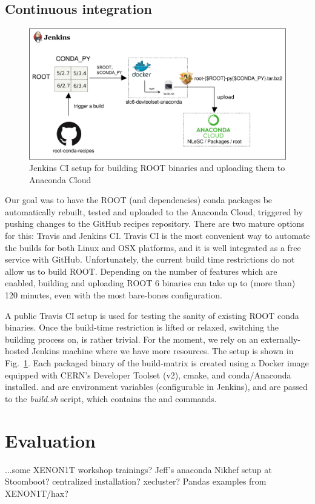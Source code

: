 \documentclass[a4paper]{jpconf}
\begin{document}
\subsection{Continuous integration}
\begin{figure}[!t]
\begin{center}
\includegraphics[width=0.8\linewidth]{./graphics/Jenkinssetup2.png}
\caption{Jenkins CI setup for building ROOT binaries and uploading them to Anaconda Cloud}
\label{fig:jenkins}
\end{center}
\end{figure}
Our goal was to have the ROOT (and dependencies) conda packages be automatically rebuilt, tested and uploaded 
to the Anaconda Cloud, triggered by pushing changes to the GitHub recipes repository. 
There are two mature options for this: Travis and Jenkins CI. 
Travis CI is the most convenient way to automate the builds for both Linux and 
OSX platforms, and it is well integrated as a free service with GitHub. Unfortunately, the current build time restrictions do not 
allow us to build ROOT. Depending on the number of features which are enabled, building and uploading ROOT 6 binaries
 can take up to (more than) 120 minutes, even with 
the most bare-bones configuration.

A public Travis CI setup is used for testing the sanity of existing ROOT conda binaries. 
Once the build-time restriction is lifted or relaxed, switching the building process on, is rather trivial.
For the moment, we rely on an externally-hosted Jenkins machine where we have more resources.
The setup is shown in Fig.~\ref{fig:jenkins}. 
Each packaged binary of the build-matrix is created using a Docker image equipped with CERN's Developer Toolset 
(v2), cmake, and conda/Anaconda installed.  and  are environment variables 
(configurable in Jenkins), and are passed to the \textit{build.sh} script, which contains the  and 
commands.


\section{Evaluation}
...some XENON1T workshop trainings?
Jeff's anaconda Nikhef setup at Stoomboot? centralized installation? xecluster?
Pandas examples from XENON1T/hax?
\end{document}

